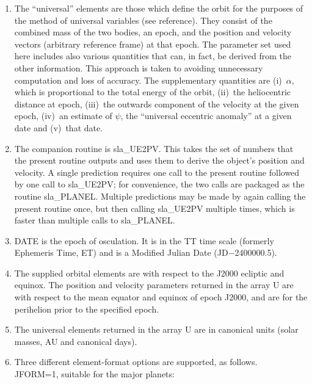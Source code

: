 \documentclass[11pt,twoside]{article}
\begin{document}
{
 \begin{enumerate}
  \item The ``universal'' elements are those which define the orbit for
        the purposes of the method of universal variables (see reference).
        They consist of the combined mass of the two bodies, an epoch,
        and the position and velocity vectors (arbitrary reference frame)
        at that epoch.  The parameter set used here includes also various
        quantities that can, in fact, be derived from the other
        information.  This approach is taken to avoiding unnecessary
        computation and loss of accuracy.  The supplementary quantities
        are (i)~$\alpha$, which is proportional to the total energy of the
        orbit, (ii)~the heliocentric distance at epoch,
        (iii)~the outwards component of the velocity at the given epoch,
        (iv)~an estimate of $\psi$, the ``universal eccentric anomaly'' at a
        given date and (v)~that date.
  \item The companion routine is sla\_UE2PV.  This takes the set of numbers
        that the present routine outputs and uses them to derive the
        object's position and velocity.  A single prediction requires one
        call to the present routine followed by one call to sla\_UE2PV;
        for convenience, the two calls are packaged as the routine
        sla\_PLANEL.  Multiple predictions may be made by again calling the
        present routine once, but then calling sla\_UE2PV multiple times,
        which is faster than multiple calls to sla\_PLANEL.
  \item DATE is the epoch of osculation.  It is in the TT time scale
        (formerly Ephemeris Time, ET) and is a Modified Julian Date
        (JD$-$2400000.5).
  \item The supplied orbital elements are with respect to the J2000
        ecliptic and equinox.  The position and velocity parameters
        returned in the array U are with respect to the mean equator and
        equinox of epoch J2000, and are for the perihelion prior to the
        specified epoch.
  \item The universal elements returned in the array U are in canonical
        units (solar masses, AU and canonical days).
  \item Three different element-format options are supported, as
        follows. \\

        JFORM=1, suitable for the major planets:


\end{enumerate}}
\end{document}
